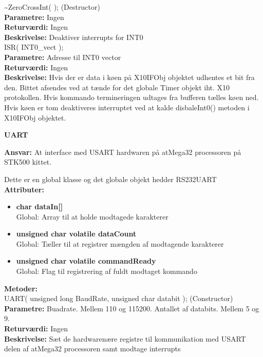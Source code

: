 \textasciitilde ZeroCrossInt( ); (Destructor) \\
\textbf{Parametre:} Ingen \\
\textbf{Returværdi:} Ingen \\
\textbf{Beskrivelse:} Deaktiver interrupts for INT0 \\

ISR( INT0\_vect ); \\
\textbf{Parametre:} Adresse til INT0 vector \\
\textbf{Returværdi:} Ingen \\
\textbf{Beskrivelse:} Hvis der er data i køen på X10IFObj objektet udhentes et bit fra den. Bittet afsendes ved at tænde for det globale Timer objekt iht. X10 protokollen. Hvis kommando termineringen udtages fra bufferen tælles køen ned. Hvis køen er tom deaktiveres interruptet ved at kalde disbaleInt0() metoden i X10IFObj objektet. \\

%
%
{\centering
\textbf{UART}\par
}
\textbf{Ansvar:} At interface med USART hardwaren på atMega32 processoren på STK500 kittet.

Dette er en global klasse og det globale objekt hedder RS232UART \\
\textbf{Attributer:}
\begin{itemize}
	\item \textbf{char dataIn[]} \\
	Global: Array til at holde modtagede karakterer
	\item \textbf{unsigned char volatile dataCount} \\
	Global: Tæller til at registrer mængden af modtagende karakterer
	\item \textbf{unsigned char volatile commandReady} \\
	Global: Flag til registrering af fuldt modtaget kommando
\end{itemize}
\textbf{Metoder:} \\
UART( unsigned long BaudRate, unsigned char databit ); (Constructor) \\
\textbf{Parametre:} Buadrate. Mellem 110 og 115200. Antallet af databits. Mellem 5 og 9. \\
\textbf{Returværdi:} Ingen \\
\textbf{Beskrivelse:} Sæt de hardwarenære registre til kommunikation med USART delen af atMega32 processoren samt modtage interrupts \\

